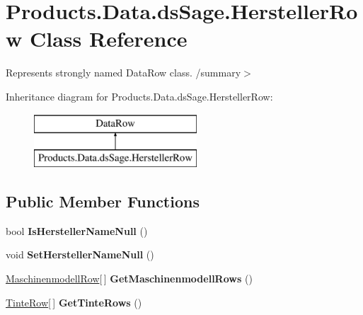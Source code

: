 \hypertarget{class_products_1_1_data_1_1ds_sage_1_1_hersteller_row}{}\section{Products.\+Data.\+ds\+Sage.\+Hersteller\+Row Class Reference}
\label{class_products_1_1_data_1_1ds_sage_1_1_hersteller_row}


Represents strongly named Data\+Row class. /summary$>$  


Inheritance diagram for Products.\+Data.\+ds\+Sage.\+Hersteller\+Row\+:\begin{figure}[H]
\begin{center}
\leavevmode
\includegraphics[height=2.000000cm]{class_products_1_1_data_1_1ds_sage_1_1_hersteller_row}
\end{center}
\end{figure}
\subsection*{Public Member Functions}
\begin{DoxyCompactItemize}
\item 
bool {\bfseries Is\+Hersteller\+Name\+Null} ()\hypertarget{class_products_1_1_data_1_1ds_sage_1_1_hersteller_row_aa3a7def23d0412fc83e0063954222bf8}{}\label{class_products_1_1_data_1_1ds_sage_1_1_hersteller_row_aa3a7def23d0412fc83e0063954222bf8}

\item 
void {\bfseries Set\+Hersteller\+Name\+Null} ()\hypertarget{class_products_1_1_data_1_1ds_sage_1_1_hersteller_row_ab8cd4d96c95f3d541e4247da078b5f8c}{}\label{class_products_1_1_data_1_1ds_sage_1_1_hersteller_row_ab8cd4d96c95f3d541e4247da078b5f8c}

\item 
\hyperlink{class_products_1_1_data_1_1ds_sage_1_1_maschinenmodell_row}{Maschinenmodell\+Row}\mbox{[}$\,$\mbox{]} {\bfseries Get\+Maschinenmodell\+Rows} ()\hypertarget{class_products_1_1_data_1_1ds_sage_1_1_hersteller_row_abd4ea6c481c0854e5eeef69c88b3eb23}{}\label{class_products_1_1_data_1_1ds_sage_1_1_hersteller_row_abd4ea6c481c0854e5eeef69c88b3eb23}

\item 
\hyperlink{class_products_1_1_data_1_1ds_sage_1_1_tinte_row}{Tinte\+Row}\mbox{[}$\,$\mbox{]} {\bfseries Get\+Tinte\+Rows} ()\hypertarget{class_products_1_1_data_1_1ds_sage_1_1_hersteller_row_a2c64c8fe8fed1cb999ca4a7cfb6a7aeb}{}\label{class_products_1_1_data_1_1ds_sage_1_1_hersteller_row_a2c64c8fe8fed1cb999ca4a7cfb6a7aeb}

\end{DoxyCompactItemize}
